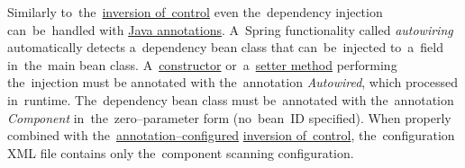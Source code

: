 \label{autowiring}
Similarly to~the~\hyperref[inversionofcontrol]{inversion of~control} even the~dependency injection can~be~handled with \hyperref[javaannotation]{Java annotations}. A~Spring functionality called \textit{autowiring} automatically detects a~dependency bean class that can~be~injected to~a~field in~the~main bean class. A~\hyperref[constructorinjection]{constructor} or~a~\hyperref[setterinjection]{setter method} performing the~injection must be annotated with the~annotation \textit{Autowired}, which processed in~runtime. The~dependency bean class must be~annotated with the~annotation \textit{Component} in~the~zero--parameter form (no~bean~ID specified). When properly combined with the~\hyperref[iocannotations]{annotation--configured} \hyperref[inversionofcontrol]{inversion of~control}, the~configuration XML file contains only the~component scanning configuration.

